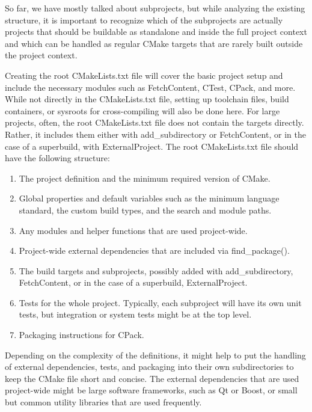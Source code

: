 So far, we have mostly talked about subprojects, but while analyzing the existing structure,
it is important to recognize which of the subprojects are actually projects that should be
buildable as standalone and inside the full project context and which can be handled as
regular CMake targets that are rarely built outside the project context.

Creating the root CMakeLists.txt file will cover the basic project setup and include
the necessary modules such as FetchContent, CTest, CPack, and more. While not
directly in the CMakeLists.txt file, setting up toolchain files, build containers, or
sysroots for cross-compiling will also be done here. For large projects, often, the root
CMakeLists.txt file does not contain the targets directly. Rather, it includes them
either with add\_subdirectory or FetchContent, or in the case of a superbuild,
with ExternalProject. The root CMakeLists.txt file should have the
following structure:

\begin{enumerate}
\item 
The project definition and the minimum required version of CMake.

\item
Global properties and default variables such as the minimum language standard, the custom build types, and the search and module paths.

\item
Any modules and helper functions that are used project-wide.

\item
Project-wide external dependencies that are included via find\_package().

\item
The build targets and subprojects, possibly added with add\_subdirectory, FetchContent, or in the case of a superbuild, ExternalProject.

\item
Tests for the whole project. Typically, each subproject will have its own unit tests, but integration or system tests might be at the top level.

\item
Packaging instructions for CPack.
\end{enumerate}

Depending on the complexity of the definitions, it might help to put the handling of external dependencies, tests, and packaging into their own subdirectories to keep the CMake file short and concise. The external dependencies that are used project-wide might be large software frameworks, such as Qt or Boost, or small but common utility libraries that are used frequently.

